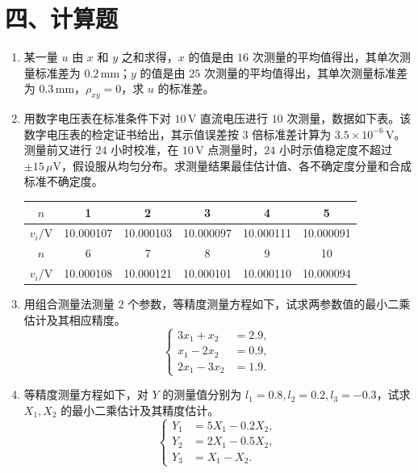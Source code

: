 \documentclass[UTF8,12pt,a4paper]{ctexart}
\begin{document}
\section*{四、计算题}
\begin{enumerate}[label=\arabic*、]
\item 某一量 $u$ 由 $x$ 和 $y$ 之和求得，$x$ 的值是由 $16$ 次测量的平均值得出，其单次测量标准差为 $0.2\,\mathrm{mm}$；$y$ 的值是由 $25$ 次测量的平均值得出，其单次测量标准差为 $0.3\,\mathrm{mm}$，$\rho_{xy}=0$，求 $u$ 的标准差。

\vspace{4cm}

\item 用数字电压表在标准条件下对 $10\,\mathrm{V}$ 直流电压进行 $10$ 次测量，数据如下表。该数字电压表的检定证书给出，其示值误差按 $3$ 倍标准差计算为 $3.5\times10^{-6}\,\mathrm{V}$。测量前又进行 $24$ 小时校准，在 $10\,\mathrm{V}$ 点测量时，$24$ 小时示值稳定度不超过 $\pm15\,\mu\mathrm{V}$，假设服从均匀分布。求测量结果最佳估计值、各不确定度分量和合成标准不确定度。
\begin{center}
\begin{tabular}{c|ccccc}
\toprule
$n$ & 1 & 2 & 3 & 4 & 5 \\
\midrule
$v_i/\mathrm{V}$ & 10.000107 & 10.000103 & 10.000097 & 10.000111 & 10.000091 \\
\midrule
$n$ & 6 & 7 & 8 & 9 & 10 \\
\midrule
$v_i/\mathrm{V}$ & 10.000108 & 10.000121 & 10.000101 & 10.000110 & 10.000094 \\
\bottomrule
\end{tabular}
\end{center}

\newpage

\item 用组合测量法测量 $2$ 个参数，等精度测量方程如下，试求两参数值的最小二乘估计及其相应精度。
\begin{equation*}
\left\{
\begin{aligned}
3x_1+x_2&=2.9,\\
x_1-2x_2&=0.9,\\
2x_1-3x_2&=1.9.
\end{aligned}
\right.
\end{equation*}

\vspace{3cm}

\item 等精度测量方程如下，对 $Y$ 的测量值分别为 $l_1=0.8,l_2=0.2,l_3=-0.3$，试求 $X_1,X_2$ 的最小二乘估计及其精度估计。
\begin{equation*}
\left\{
\begin{aligned}
Y_1&=5X_1-0.2X_2,\\
Y_2&=2X_1-0.5X_2,\\
Y_3&=X_1-X_2.
\end{aligned}
\right.
\end{equation*}


\end{enumerate}
\end{document}
